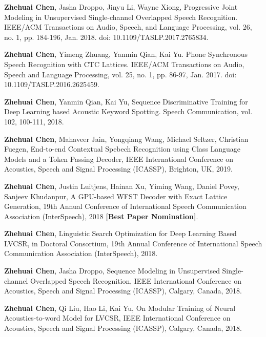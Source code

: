 
\begin{publications}{99}
 \item {\bf Zhehuai Chen}, Jasha Droppo, Jinyu Li, Wayne Xiong, Progressive Joint Modeling in Unsupervised Single-channel Overlapped Speech Recognition. IEEE/ACM Transactions on Audio, Speech, and Language Processing, vol. 26, no. 1, pp. 184-196, Jan. 2018. doi:  10.1109/TASLP.2017.2765834.
 \item {\bf Zhehuai Chen}, Yimeng Zhuang, Yanmin Qian, Kai Yu. Phone Synchronous Speech Recognition with CTC Lattices. IEEE/ACM Transactions on Audio, Speech and Language Processing, vol. 25, no. 1, pp. 86-97, Jan. 2017. doi: 10.1109/TASLP.2016.2625459.
  \item {\bf Zhehuai Chen}, Yanmin Qian, Kai Yu, Sequence Discriminative Training for Deep Learning based Acoustic Keyword Spotting. Speech Communication, vol. 102, 100-111, 2018.
 \\
  \item {\bf Zhehuai Chen}, Mahaveer Jain, Yongqiang Wang, Michael Seltzer, Christian Fuegen, End-to-end Contextual Spebech Recognition using Class Language Models and a Token Passing Decoder, IEEE International Conference on Acoustics, Speech and Signal Processing (ICASSP), Brighton, UK, 2019.
  \item {\bf Zhehuai Chen}, Justin Luitjens, Hainan Xu, Yiming Wang, Daniel Povey, Sanjeev Khudanpur, A GPU-based WFST Decoder with Exact Lattice Generation,  19th Annual Conference of  International Speech Communication Association (InterSpeech), 2018 {\bf [Best Paper Nomination]}.
  \item {\bf Zhehuai Chen}, Linguistic Search Optimization for Deep Learning Based LVCSR, in Doctoral Consortium, 19th Annual Conference of  International Speech Communication Association (InterSpeech), 2018.
  \item {\bf Zhehuai Chen}, Jasha Droppo, Sequence Modeling in Unsupervised Single-channel Overlapped Speech Recognition,  IEEE International Conference on Acoustics, Speech and Signal Processing (ICASSP), Calgary, Canada, 2018.
  \item {\bf Zhehuai Chen}, Qi Liu, Hao Li, Kai Yu, On Modular Training of Neural Acoustics-to-word Model for LVCSR,  IEEE International Conference on Acoustics, Speech and Signal Processing (ICASSP), Calgary, Canada, 2018.

\end{publications}
